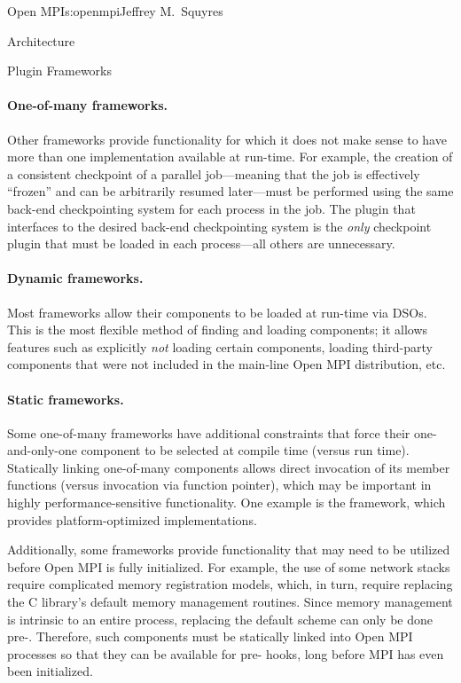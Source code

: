 \begin{aosachapter}{Open MPI}{s:openmpi}{Jeffrey M.\ Squyres}
\begin{aosasect1}{Architecture}
\begin{aosasect2}{Plugin Frameworks}

\paragraph{One-of-many frameworks.} 

Other frameworks provide functionality for which it does not make sense to
have more than one implementation available at run-time.
%
For example, the creation of a consistent checkpoint of a parallel 
job---meaning that the job is effectively ``frozen'' and can be arbitrarily
resumed later---must be performed using the same back-end
checkpointing system for each process in the job.
%
The plugin that interfaces to the desired back-end checkpointing
system is the \emph{only} checkpoint plugin that must be loaded in each
process---all others are unnecessary.


\paragraph{Dynamic frameworks.} 

Most frameworks allow their components to be loaded at run-time via
DSOs.  This is the most flexible method of finding and loading
components; it allows features such as explicitly \emph{not} loading
certain components, loading third-party components that were not
included in the main-line Open MPI distribution, etc.


\paragraph{Static frameworks.} 

Some one-of-many frameworks have additional constraints that force
their one-and-only-one component to be selected at compile time (versus
run time).  Statically linking one-of-many components allows direct
invocation of its member functions (versus invocation via function
pointer), which may be important in highly performance-sensitive
functionality.  One example is the  framework, which
provides platform-optimized  implementations.

Additionally, some frameworks provide functionality that may need to
be utilized before Open MPI is fully initialized.  
%
For example, the use of some network stacks require complicated memory
registration models, which, in turn, require replacing the C library's
default memory management routines.
%
Since memory management is intrinsic to an entire process, replacing
the default scheme can only be done pre-.
%
Therefore, such components must be statically linked into Open MPI
processes so that they can be available for pre- hooks, long
before MPI has even been initialized.


\end{aosasect2}
\end{aosasect1}
\end{aosachapter}
